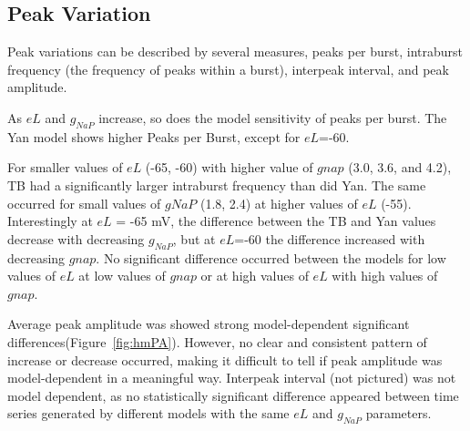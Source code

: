 \documentclass[11pt]{article}
\begin{document}
%
%


\subsection{Peak Variation}
Peak variations can be described by several measures, peaks per burst, intraburst frequency (the frequency of peaks within a burst), interpeak interval, and peak amplitude.


As $eL$ and $g_{NaP}$ increase, so does the model sensitivity of peaks per burst. The Yan model shows higher Peaks per Burst, except for $eL$=-60.

For smaller values of $eL$ (-65, -60) with higher value of $gnap$ (3.0, 3.6, and 4.2), TB had a significantly larger intraburst frequency than did Yan. The same occurred for small values of $gNaP$ (1.8, 2.4) at higher values of $eL$ (-55). Interestingly at $eL$ = -65 mV, the difference between the TB and Yan values decrease with decreasing $g_{NaP}$, but at $eL$=-60 the difference increased with decreasing $gnap$. No significant difference occurred between the models for low values of $eL$ at low values of $gnap$ or at high values of $eL$ with high values of $gnap$.

Average peak amplitude was showed strong model-dependent significant differences(Figure~\ref{fig:hmPA}). However, no clear and consistent pattern of increase or decrease occurred, making it difficult to tell if peak amplitude was model-dependent in a meaningful way. Interpeak interval (not pictured) was not model dependent, as no statistically significant difference appeared between time series generated by different models with the same $eL$ and $g_{NaP}$ parameters.
\end{document}
